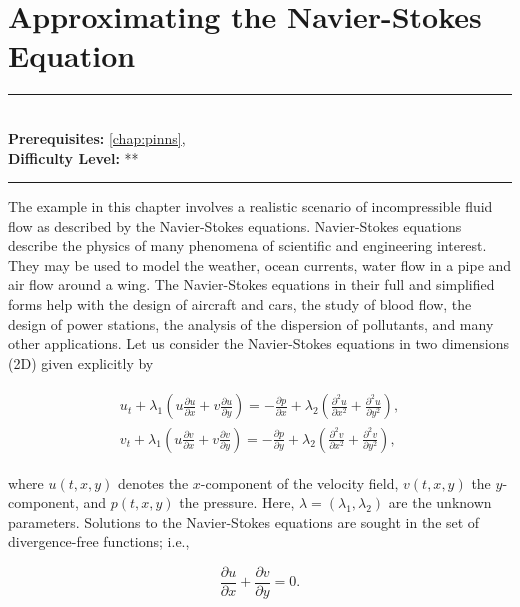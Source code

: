 \documentclass[book.tex]{subfiles}
\begin{document}
\chapter{Approximating the Navier-Stokes Equation}
\label{chap:pinns_ns}
\noindent\rule{11cm}{0.4pt} \\
\textbf{Prerequisites:}  \autoref{chap:pinns},  \\
\textbf{Difficulty Level:} ** \\
\noindent\rule{11cm}{0.4pt}
\vspace{5mm}

The example in this chapter involves a realistic scenario of incompressible fluid flow as described by the Navier-Stokes equations. Navier-Stokes equations describe the physics of many phenomena of scientific and engineering interest. They may be used to model the weather, ocean currents, water flow in a pipe and air flow around a wing. The Navier-Stokes equations in their full and simplified forms help with the design of aircraft and cars, the study of blood flow, the design of power stations, the analysis of the dispersion of pollutants, and many other applications. Let us consider the Navier-Stokes equations in two dimensions (2D) given explicitly by


\begin{align}
\begin{split}
u_t + \lambda_1 \left (u \frac{\partial u}{\partial x} + v \frac{\partial u}{\partial y}\right ) = -\frac{\partial p}{\partial x} + \lambda_2\left (\frac{\partial^2 u}{\partial x^2} + \frac{\partial^2 u}{\partial y^2}\right ),\\
v_t + \lambda_1 \left (u \frac{\partial v}{\partial x} + v \frac{\partial v}{\partial y} \right ) = -\frac{\partial p}{\partial y} + \lambda_2\left (\frac{\partial^2 v}{\partial x^2} + \frac{\partial^2 v}{\partial y^2}\right ),    
\end{split}
\end{align}


where $u(t, x, y)$ denotes the $x$-component of the velocity field, $v(t, x, y)$ the $y$-component, and $p(t, x, y)$ the pressure. Here, $\lambda = (\lambda_1, \lambda_2)$ are the unknown parameters. Solutions to the Navier-Stokes equations are sought in the set of divergence-free functions; i.e.,

\begin{equation}
\frac{\partial u}{\partial x} + \frac{\partial v}{\partial y} = 0.    
\end{equation}
\end{document}
